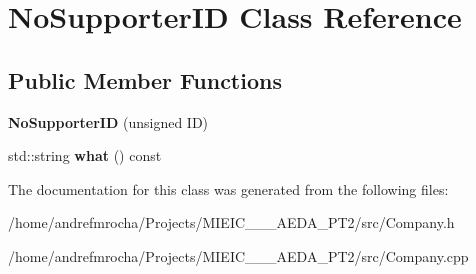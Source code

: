 \hypertarget{class_no_supporter_i_d}{}\section{No\+Supporter\+ID Class Reference}
\label{class_no_supporter_i_d}
\subsection*{Public Member Functions}
\begin{DoxyCompactItemize}
\item 
\mbox{\label{class_no_supporter_i_d_a0aae4bb93d024e4a31dfd67d3771b8c8}} 
{\bfseries No\+Supporter\+ID} (unsigned ID)
\item 
\mbox{\label{class_no_supporter_i_d_a4da6312928c4bac348c5e8e9f9e04d4f}} 
std\+::string {\bfseries what} () const
\end{DoxyCompactItemize}


The documentation for this class was generated from the following files\+:\begin{DoxyCompactItemize}
\item 
/home/andrefmrocha/\+Projects/\+M\+I\+E\+I\+C\+\_\+\_\+\_\+\+A\+E\+D\+A\+\_\+\+P\+T2/src/Company.\+h\item 
/home/andrefmrocha/\+Projects/\+M\+I\+E\+I\+C\+\_\+\_\+\_\+\+A\+E\+D\+A\+\_\+\+P\+T2/src/Company.\+cpp\end{DoxyCompactItemize}
